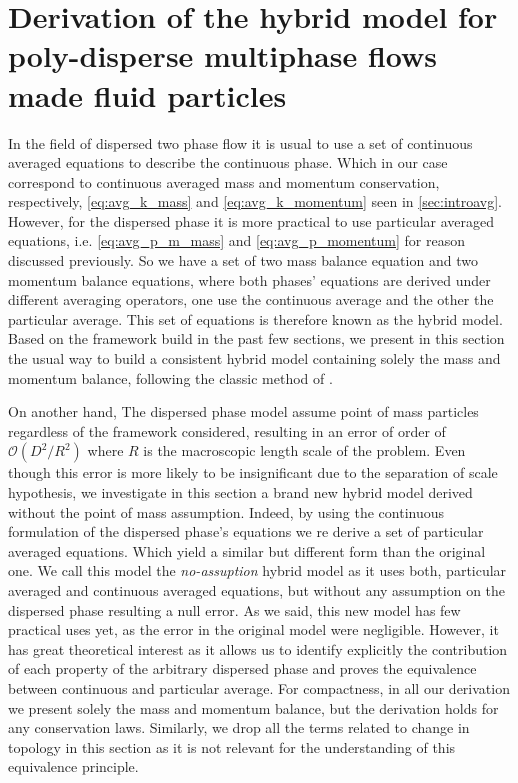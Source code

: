 \section{Derivation of the hybrid model for poly-disperse multiphase flows made fluid particles}
\label{sec:hybrid_model}


In the field of dispersed two phase flow it is usual to use a set of continuous averaged equations to describe the continuous phase. 
Which in our case correspond to continuous averaged mass and momentum conservation, respectively, \ref{eq:avg_k_mass} and \ref{eq:avg_k_momentum} seen in \ref{sec:introavg}.
However, for the dispersed phase it is more practical to use particular averaged equations, i.e. \ref{eq:avg_p_m_mass} and \ref{eq:avg_p_momentum} for reason discussed previously.
So we have a set of two mass balance equation and two momentum balance equations, where both phases' equations are derived under different averaging operators, one use the continuous average and the other the particular average.
This set of equations is therefore known as the hybrid model. 
Based on the framework build in the past few sections, we present in this section the usual way to build a consistent hybrid model containing solely the mass and momentum balance, following the classic method of \citet{jackson1997locally}. 

On another hand, The dispersed phase model assume point of mass particles regardless of the framework considered, resulting in an error of order of $\mathcal{O}(D^2 /R^2)$ where $R$ is the macroscopic length scale of the problem.    
Even though this error is more likely to be insignificant due to the separation of scale hypothesis, we investigate in this section a brand new hybrid model derived without the point of mass assumption. 
Indeed, by using the continuous formulation of the dispersed phase's equations we re derive a set of particular averaged equations. 
Which yield a similar but different form than the original one. 
We call this model the \textit{no-assuption} hybrid model as it uses both, particular averaged and continuous averaged equations, but without any assumption on the dispersed phase resulting a null error. 
As we said, this new model has few practical uses yet, as the error in the original model were negligible.
However, it has great theoretical interest as it allows us to identify explicitly the contribution of each property of the arbitrary dispersed phase and proves the equivalence between continuous and particular average. 
For compactness, in all our derivation we present solely the mass and momentum balance, but the derivation holds for any conservation laws.
Similarly, we drop all the terms related to change in topology in this section as it is not relevant for the understanding of this equivalence principle. 

